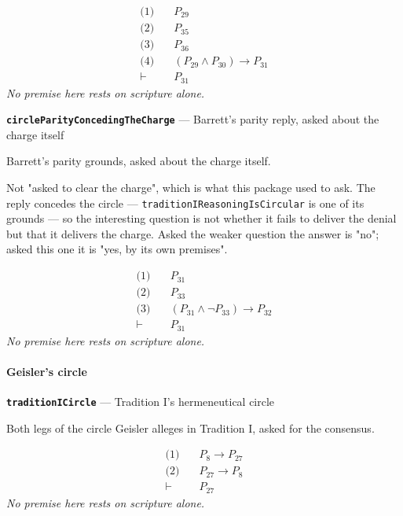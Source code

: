 \documentclass[11pt]{article}
\begin{document}
\begin{align*}
  \text{(1)} \quad & P_{29} \\
  \text{(2)} \quad & P_{35} \\
  \text{(3)} \quad & P_{36} \\
  \text{(4)} \quad & (P_{29} \land P_{30}) \rightarrow P_{31} \\
  \vdash \quad & P_{31}
\end{align*}
\emph{No premise here rests on scripture alone.}
\par\medskip\noindent\textbf{\texttt{circle\allowbreak{}Parity\allowbreak{}Conceding\allowbreak{}The\allowbreak{}Charge}} --- Barrett's parity reply, asked about the charge itself\par\nobreak\noindent
Barrett's parity grounds, asked about the charge itself.

Not "asked to clear the charge", which is what this package used to ask. The reply concedes the circle — \texttt{tradition\allowbreak{}IReasoning\allowbreak{}Is\allowbreak{}Circular} is one of its grounds — so the interesting question is not whether it fails to deliver the denial but that it delivers the charge. Asked the weaker question the answer is "no"; asked this one it is "yes, by its own premises".

\begin{align*}
  \text{(1)} \quad & P_{31} \\
  \text{(2)} \quad & P_{33} \\
  \text{(3)} \quad & (P_{31} \land \lnot P_{33}) \rightarrow P_{32} \\
  \vdash \quad & P_{31}
\end{align*}
\emph{No premise here rests on scripture alone.}
\paragraph*{Geisler's circle}
\leavevmode\par
\par\medskip\noindent\textbf{\texttt{tradition\allowbreak{}ICircle}} --- Tradition I's hermeneutical circle\par\nobreak\noindent
Both legs of the circle Geisler alleges in Tradition I, asked for the consensus.

\begin{align*}
  \text{(1)} \quad & P_{8} \rightarrow P_{27} \\
  \text{(2)} \quad & P_{27} \rightarrow P_{8} \\
  \vdash \quad & P_{27}
\end{align*}
\emph{No premise here rests on scripture alone.}
\end{document}
